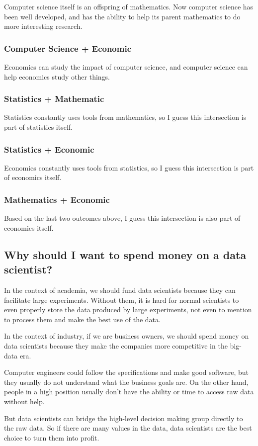 Computer science itself is an offspring of mathematics.
Now computer science has been well developed, and has the ability to help its parent mathematics to do more interesting research.

\subsubsection*{Computer Science + Economic}

Economics can study the impact of computer science, and computer science can help economics study other things.

\subsubsection*{Statistics + Mathematic}

Statistics constantly uses tools from mathematics, so I guess this intersection is part of statistics itself.

\subsubsection*{Statistics + Economic}

Economics constantly uses tools from statistics, so I guess this intersection is part of economics itself.

\subsubsection*{Mathematics + Economic}

Based on the last two outcomes above, I guess this intersection is also part of economics itself.

\newpage
\subsection*{Why should I want to spend money on a data scientist?}

In the context of academia, we should fund data scientists because they can facilitate large experiments.
Without them, it is hard for normal scientists to even properly store the data produced by large experiments, not even to mention to process them and make the best use of the data.

In the context of industry, if we are business owners, we should spend money on data scientists because they make the companies more competitive in the big-data era.

Computer engineers could follow the specifications and make good software, but they usually do not understand what the business goals are.
On the other hand, people in a high position usually don't have the ability or time to access raw data without help.

But data scientists can bridge the high-level decision making group directly to the raw data.
So if there are many values in the data, data scientists are the best choice to turn them into profit.




